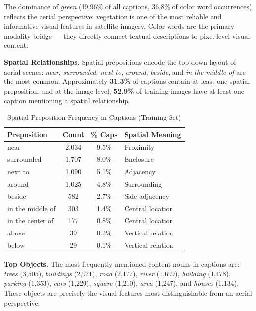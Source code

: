 The dominance of \textit{green} (19.96\% of all captions, 36.8\% of color word occurrences) reflects the aerial perspective: vegetation is one of the most reliable and informative visual features in satellite imagery. Color words are the primary modality bridge --- they directly connect textual descriptions to pixel-level visual content.

\textbf{Spatial Relationships.} Spatial prepositions encode the top-down layout of aerial scenes: \textit{near}, \textit{surrounded}, \textit{next to}, \textit{around}, \textit{beside}, and \textit{in the middle of} are the most common. Approximately \textbf{31.3\%} of captions contain at least one spatial preposition, and at the image level, \textbf{52.9\%} of training images have at least one caption mentioning a spatial relationship.

\begin{table}[H]
\centering
\caption{Spatial Preposition Frequency in Captions (Training Set)}
\label{tab:spatial_words}
\begin{tabular}{|l|c|c|l|}
\hline
\textbf{Preposition} & \textbf{Count} & \textbf{\% Caps} & \textbf{Spatial Meaning} \\
\hline
near & 2,034 & 9.5\% & Proximity \\
surrounded & 1,707 & 8.0\% & Enclosure \\
next to & 1,090 & 5.1\% & Adjacency \\
around & 1,025 & 4.8\% & Surrounding \\
beside & 582 & 2.7\% & Side adjacency \\
in the middle of & 303 & 1.4\% & Central location \\
in the center of & 177 & 0.8\% & Central location \\
above & 39 & 0.2\% & Vertical relation \\
below & 29 & 0.1\% & Vertical relation \\
\hline
\end{tabular}
\end{table}

\textbf{Top Objects.} The most frequently mentioned content nouns in captions are: \textit{trees} (3,505), \textit{buildings} (2,921), \textit{road} (2,177), \textit{river} (1,699), \textit{building} (1,478), \textit{parking} (1,353), \textit{cars} (1,220), \textit{square} (1,210), \textit{area} (1,247), and \textit{houses} (1,134). These objects are precisely the visual features most distinguishable from an aerial perspective.

